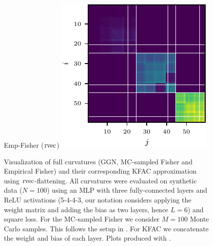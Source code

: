 \begin{figure}[t!]
\begin{minipage}[t]{0.485\linewidth}
    \centering
    Emp-Fisher ($\operatorname{rvec}$)\vspace{1ex}
    \includegraphics[width=0.8\linewidth]{../kfs/plots/synthetic_rvec_empfisher_kfac.pdf}
  \end{minipage}
  \caption{Visualization of full curvatures (GGN, MC-sampled Fisher and Empirical Fisher) and their corresponding KFAC approximation using $\operatorname{rvec}$-flattening. All curvatures were evaluated on synthetic data ($N = 100$) using an MLP with three fully-connected layers and ReLU activations (5-4-4-3, our notation considers applying the weight matrix and adding the bias as two layers, hence $L=6$) and square loss. For the MC-sampled Fisher we consider $M = 100$ Monte Carlo samples. This follows the setup in . For KFAC we concatenate the weight and bias of each layer.
    Plots produced with .}
  \label{fig:rvec-kfac-full-comparison}
\end{figure}

\switchcolumn[0]


